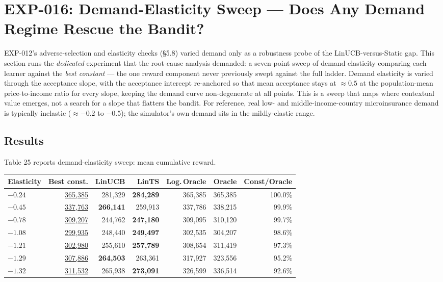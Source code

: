 \section{EXP-016: Demand-Elasticity Sweep --- Does Any Demand Regime Rescue the Bandit?}\label{exp-016-demand-elasticity-sweep}

EXP-012's adverse-selection and elasticity checks (§5.8) varied demand only as a robustness probe of the LinUCB-versus-Static gap. This section runs the \emph{dedicated} experiment that the root-cause analysis demanded: a seven-point sweep of demand elasticity comparing each learner against the \emph{best constant} --- the one reward component never previously swept against the full ladder. Demand elasticity is varied through the acceptance slope, with the acceptance intercept re-anchored so that mean acceptance stays at \(\approx 0.5\) at the population-mean price-to-income ratio for every slope, keeping the demand curve non-degenerate at all points. This is a sweep that maps where contextual value emerges, not a search for a slope that flatters the bandit. For reference, real low- and middle-income-country microinsurance demand is typically inelastic (\(\approx -0.2\) to \(-0.5\)); the simulator's own demand sits in the mildly-elastic range.

\subsection{Results}\label{elasticity-results}

Table 25 reports demand-elasticity sweep: mean cumulative reward.

\label{tab:5.12.1}

{\def\LTcaptype{none}
\footnotesize
\begin{longtable}{@{}lrrrrrr@{}}
\toprule
Elasticity & Best const. & LinUCB & LinTS & Log.\,Oracle & Oracle & Const/Oracle \\
\midrule
\endhead
\bottomrule
\endlastfoot
\(-0.24\) & \underline{365,385} & 281,329 & \textbf{284,289} & 365,385 & 365,385 & 100.0\% \\
\(-0.45\) & \underline{337,763} & \textbf{266,141} & 259,913 & 337,786 & 338,215 & 99.9\% \\
\(-0.78\) & \underline{309,207} & 244,762 & \textbf{247,180} & 309,095 & 310,120 & 99.7\% \\
\(-1.08\) & \underline{299,935} & 248,440 & \textbf{249,497} & 302,535 & 304,207 & 98.6\% \\
\(-1.21\) & \underline{302,980} & 255,610 & \textbf{257,789} & 308,654 & 311,419 & 97.3\% \\
\(-1.29\) & \underline{307,886} & \textbf{264,503} & 263,361 & 317,927 & 323,556 & 95.2\% \\
\(-1.32\) & \underline{311,532} & 265,938 & \textbf{273,091} & 326,599 & 336,514 & 92.6\% \\
\end{longtable}
}

